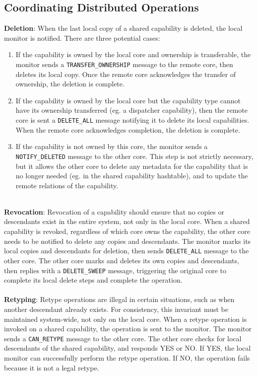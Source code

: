 \subsection{Coordinating Distributed Operations}

\textbf{Deletion}: 
When the last local copy of a shared capability is deleted, the local monitor is notified. There are three potential cases: \\
\begin{enumerate}
    \item If the capability is owned by the local core and ownership is transferable, the monitor sends a \texttt{TRANSFER\_OWNERSHIP} message to the remote core, then deletes its local copy. Once the remote core acknowledges the transfer of ownership, the deletion is complete.
    \item If the capability is owned by the local core but the capability type cannot have its ownership transferred (eg. a dispatcher capability), then the remote core is sent a \texttt{DELETE\_ALL} message notifying it to delete its local capabilities. When the remote core acknowledges completion, the deletion is complete.
    \item If the capability is not owned by this core, the monitor sends a \texttt{NOTIFY\_DELETED} message to the other core. This step is not strictly necessary, but it allows the other core to delete any metadata for the capability that is no longer needed (eg. in the shared capability hashtable), and to update the remote relations of the capability.
\end{enumerate}
\\
\textbf{Revocation}: Revocation of a capability should ensure that no copies or descendants exist in the entire system, not only in the local core. When a shared capability is revoked, regardless of which core owns the capability, the other core needs to be notified to delete any copies and descendants. The monitor marks its local copies and descendants for deletion, then sends \texttt{DELETE\_ALL} message to the other core. The other core marks and deletes its own copies and descendants, then replies with a \texttt{DELETE\_SWEEP} message, triggering the original core to complete its local delete steps and complete the operation.
\\\\
\textbf{Retyping}: Retype operations are illegal in certain situations, such as when another descendant already exists. For consistency, this invariant must be maintained system-wide, not only on the local core. When a retype operation is invoked on a shared capability, the operation is sent to the monitor. The monitor sends a \texttt{CAN\_RETYPE} message to the other core. The other core checks for local descendants of the shared capability, and responds YES or NO. If YES, the local monitor can successfully perform the retype operation. If NO, the operation fails because it is not a legal retype.

